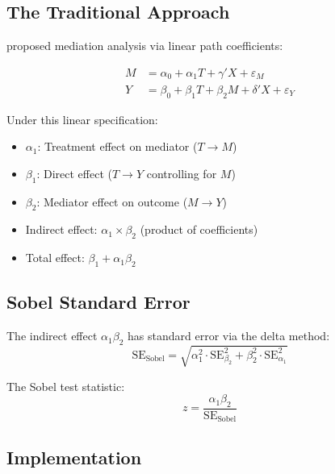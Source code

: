 \subsection{The Traditional Approach}

\textcite{baron1986moderator} proposed mediation analysis via linear path coefficients:

\begin{definition}
\begin{align}
M &= \alpha_0 + \alpha_1 T + \gamma' X + \varepsilon_M \label{eq:bk-mediator}\\
Y &= \beta_0 + \beta_1 T + \beta_2 M + \delta' X + \varepsilon_Y \label{eq:bk-outcome}
\end{align}
\end{definition}

Under this linear specification:
\begin{itemize}
\item $\alpha_1$: Treatment effect on mediator ($T \to M$)
\item $\beta_1$: Direct effect ($T \to Y$ controlling for $M$)
\item $\beta_2$: Mediator effect on outcome ($M \to Y$)
\item Indirect effect: $\alpha_1 \times \beta_2$ (product of coefficients)
\item Total effect: $\beta_1 + \alpha_1 \beta_2$
\end{itemize}

\subsection{Sobel Standard Error}

The indirect effect $\alpha_1 \beta_2$ has standard error via the delta method:
\begin{equation}
\text{SE}_{\text{Sobel}} = \sqrt{\alpha_1^2 \cdot \text{SE}_{\beta_2}^2 + \beta_2^2 \cdot \text{SE}_{\alpha_1}^2}
\end{equation}

The Sobel test statistic:
\begin{equation}
z = \frac{\alpha_1 \beta_2}{\text{SE}_{\text{Sobel}}}
\end{equation}

\subsection{Implementation}

